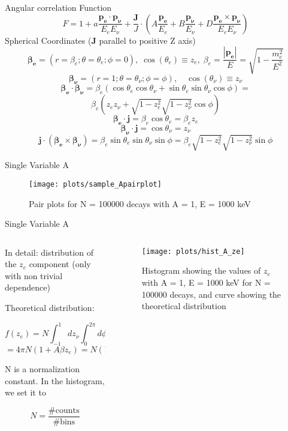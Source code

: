 \documentclass{beamer}
\begin{document}
\begin{frame}{Angular correlation Function}
	$$F = 1 + a \frac{\boldsymbol{p_e}\cdot\boldsymbol{p_\nu}}{E_eE_\nu} + \frac{\boldsymbol{J}}J\cdot\left(A \frac{\boldsymbol{p_e}}{E_e} + B \frac{\boldsymbol{p_\nu}}{E_\nu} + D \frac{\boldsymbol{p_e}\times\boldsymbol{p_\nu}}{E_eE_\nu}\right)$$
	Spherical Coordinates ($\boldsymbol{J}$ parallel to positive Z axis)
	$$\boldsymbol{\beta_e} = (r=\beta_e;\theta=\theta_e;\phi=0),\;\cos(\theta_e) \equiv z_e,\;\beta_e = \frac{|\boldsymbol{p_e}|}{E} = \sqrt{1-\frac{m_e^2}{E^2}}$$
	$$\boldsymbol{\beta_\nu} = (r=1;\theta=\theta_\nu;\phi=\phi),\quad\cos(\theta_\nu) \equiv z_\nu$$
	$$\boldsymbol{\beta_e}\cdot\boldsymbol{\beta_\nu} = \beta_e(\cos\theta_e\cos\theta_\nu + \sin\theta_e\sin\theta_\nu\cos\phi) =$$
	$$ \beta_e(z_ez_\nu + \sqrt{1-z^2_e}\sqrt{1-z^2_\nu}\cos\phi)$$
	$$\boldsymbol{\beta_e}\cdot\boldsymbol{j} = \beta_e\cos\theta_e=\beta_ez_e$$
	$$\boldsymbol{\beta_\nu}\cdot\boldsymbol{j} = \cos\theta_\nu=z_\nu$$
	$$\boldsymbol{j}\cdot(\boldsymbol{\beta_e}\times\boldsymbol{\beta_\nu})=\beta_e\sin\theta_e\sin\theta_\nu\sin\phi=\beta_e\sqrt{1-z^2_e}\sqrt{1-z^2_\nu}\sin\phi$$
\end{frame}	
\begin{frame}{Single Variable A}
	\begin{figure}
		\centering
		\texttt{[image: plots/sample\_Apairplot]}
		\caption{Pair plots for N = 100000 decays with A = 1, E = 1000 keV}
	\end{figure}
\end{frame}
\begin{frame}{Single Variable A}
	\begin{columns}
		\begin{column}{0.425\textwidth}
			In detail: distribution of the $z_e$ component (only with non trivial dependence)
			
			Theoretical distribution: 
			
			$$f(z_e) = N\int_{-1}^{1}dz_\nu\int_{0}^{2\pi}d\phi F = $$$$= 4\pi N (1+A\beta z_e) = N(1+A\beta z_e)$$
			
			N is a normalization constant. In the histogram, we set it to 
			
			$$N =  \frac{\# \text{counts}}{\# \text{bins}}$$ 

		\end{column}
		\begin{column}{0.575\textwidth}
			\begin{figure}
				\centering
				\texttt{[image: plots/hist\_A\_ze]}
				\caption{Histogram showing the values of $z_e$ with A = 1, E = 1000 keV for N = 100000 decays, and curve showing the theoretical distribution}
			\end{figure}
		\end{column}
	\end{columns}
\end{frame}
\end{document}
